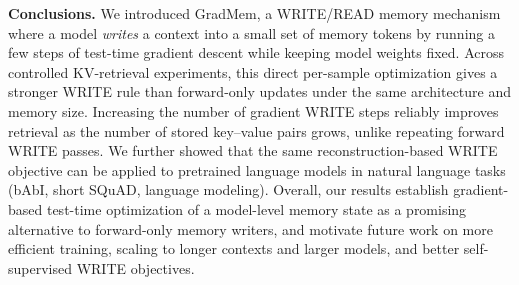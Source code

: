 \documentclass{article}
\theoremstyle{plain}
\theoremstyle{definition}
\theoremstyle{remark}
\begin{document}
{\textbf{Conclusions.}
We introduced GradMem, a WRITE/READ memory mechanism where a model \emph{writes} a context into a small set of memory tokens by running a few steps of test-time gradient descent while keeping model weights fixed.
Across controlled KV-retrieval experiments, this direct per-sample optimization gives a stronger WRITE rule than forward-only updates under the same architecture and memory size. Increasing the number of gradient WRITE steps reliably improves retrieval as the number of stored key--value pairs grows, unlike repeating forward WRITE passes.
We further showed that the same reconstruction-based WRITE objective can be applied to pretrained language models in natural language tasks (bAbI, short SQuAD, language modeling).
Overall, our results establish gradient-based test-time optimization of a model-level memory state as a promising alternative to forward-only memory writers, and motivate future work on more efficient training, scaling to longer contexts and larger models, and better self-supervised WRITE objectives.











\newpage
\appendix
\onecolumn

}
\end{document}
